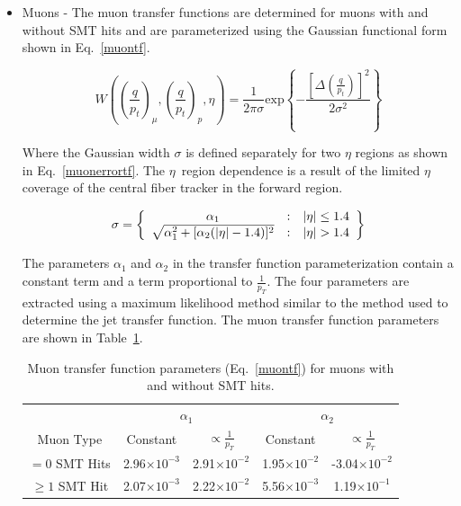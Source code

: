 \begin{itemize}
\begin{itemize}
\item Muons - The muon transfer functions are determined for muons with and without SMT hits and are parameterized using the Gaussian functional form shown in Eq.~\ref{muontf}.

\begin{equation}
\label{muontf}
W\left(\left( \frac{q}{p_t}\right)_{\mu}, \left( \frac{q}{p_t}\right)_{p}, \eta \right) = 
\frac{1}{2\pi\sigma}\mathrm{exp}
\left\{-\frac{\left[\Delta
\left( \frac{q}{p_t} \right)\right]^2}
{2\sigma^2}\right\}
\end{equation}

\noindent Where the Gaussian width $\sigma$ is defined separately for two $\eta$ regions as shown in Eq.~\ref{muonerrortf}. The $\eta$~region dependence is a result of the limited $\eta$ coverage of the central fiber tracker in the forward region.

\begin{equation}
\label{muonerrortf}
\sigma  =  \left\{ 
\begin{array} {c@{\quad:\quad}l} \alpha_{1} &
|\eta| \le 1.4 \\
\sqrt{\alpha^{2}_{1} + [\alpha_{2}(|\eta| - 1.4)]^2} &
|\eta| > 1.4 
\end{array} \right\}
\end{equation}

The parameters $\alpha_{1}$ and $\alpha_{2}$ in the transfer function parameterization contain a constant term and a term proportional to $\frac{1}{p_{T}}$. The four parameters are extracted using a maximum likelihood method similar to the method used to determine the jet transfer function. The muon transfer function parameters are shown in Table~\ref{muontfparams}.

\begin{table}[!h!tbp]
\begin{center}
\caption{Muon transfer function parameters (Eq.~\ref{muontf}) for muons with and without SMT hits.}
\label{muontfparams}
\begin{tabular}{c|cc|cc}
       & \multicolumn{2}{|c|}{$\alpha_{1}$} & \multicolumn{2}{|c}{$\alpha_{2}$} \\
Muon Type		& Constant			& $\propto \frac{1}{p_{T}}$	&	Constant			&	$\propto \frac{1}{p_{T}}$		\\
\hline
$=0$ SMT Hits		& 2.96$\times10^{-3}$	& 2.91$\times10^{-2}$		& 1.95$\times10^{-2}$	& -3.04$\times10^{-2}$		\\
$\geq1$ SMT Hit	& 2.07$\times10^{-3}$	& 2.22$\times10^{-2}$		& 5.56$\times10^{-3}$	& 1.19$\times10^{-1}$		\\
\end{tabular}
\vspace{-0.1 in}
\end{center}
\end{table} 


\end{itemize}
\end{itemize}
